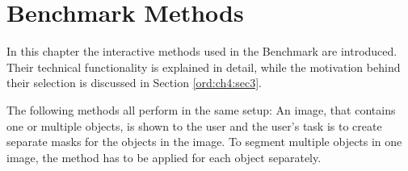
\chapter{Benchmark Methods}\label{ord:ch3}

In this chapter the interactive methods used in the Benchmark are introduced.
Their technical functionality is explained in detail, while the motivation behind their selection is discussed in Section \ref{ord:ch4:sec3}.

The following methods all perform in the same setup: An image, that contains one or multiple objects, is shown to the user and the user's task is to create separate masks for the objects in the image.
To segment multiple objects in one image, the method has to be applied for each object separately.




